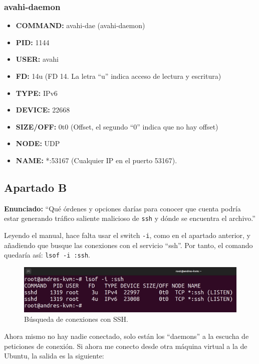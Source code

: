 \documentclass{article}
\begin{document}
\subsubsection{avahi-daemon}
\begin{itemize}
    \item \textbf{COMMAND: }avahi-dae (avahi-daemon)
    \item \textbf{PID: }1144
    \item \textbf{USER: }avahi
    \item \textbf{FD: }14u (FD 14. La letra ``u'' indica acceso de lectura y escritura)
    \item \textbf{TYPE: }IPv6
    \item \textbf{DEVICE: }22668
    \item \textbf{SIZE/OFF: }0t0 (Offset, el segundo ``0'' indica que no hay offset)
    \item \textbf{NODE: }UDP
    \item \textbf{NAME: }*:53167 (Cualquier IP en el puerto 53167).
\end{itemize}


\subsection{Apartado B}

\textbf{Enunciado: }``Qué órdenes y opciones darías para conocer que cuenta podría estar generando tráfico saliente malicioso de \texttt{ssh} y dónde se encuentra el archivo.''

\bigskip

Leyendo el manual, hace falta usar el switch \verb|-i|, como en el apartado anterior, y añadiendo que busque las conexiones con el servicio ``ssh''. Por tanto, el comando quedaría así: \verb|lsof -i :ssh|.

\begin{figure}[H]
    \includegraphics[width=\textwidth]{imagenes/lsofisshlisten.png}
    \caption{Búsqueda de conexiones con SSH.}
\end{figure}

Ahora mismo no hay nadie conectado, solo están los ``daemons'' a la escucha de peticiones de conexión. Si ahora me conecto desde otra máquina virtual a la de Ubuntu, la salida es la siguiente:
\end{document}
